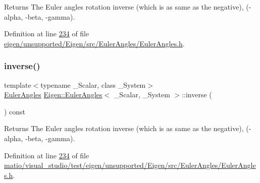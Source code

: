 \begin{DoxyReturn}{Returns}
The Euler angles rotation inverse (which is as same as the negative), (-\/alpha, -\/beta, -\/gamma). 
\end{DoxyReturn}


Definition at line \hyperlink{eigen_2unsupported_2_eigen_2src_2_euler_angles_2_euler_angles_8h_source_l00234}{234} of file \hyperlink{eigen_2unsupported_2_eigen_2src_2_euler_angles_2_euler_angles_8h_source}{eigen/unsupported/\+Eigen/src/\+Euler\+Angles/\+Euler\+Angles.\+h}.

\mbox{\label{class_eigen_1_1_euler_angles_a1c37cedc590311d6ecaec7215d7c8f2c}} 
\subsubsection{\texorpdfstring{inverse()}{inverse()}\hspace{0.1cm}{\footnotesize\ttfamily [2/2]}}
{\footnotesize\ttfamily template$<$typename \+\_\+\+Scalar, class \+\_\+\+System$>$ \\
\hyperlink{class_eigen_1_1_euler_angles}{Euler\+Angles} \hyperlink{class_eigen_1_1_euler_angles}{Eigen\+::\+Euler\+Angles}$<$ \+\_\+\+Scalar, \+\_\+\+System $>$\+::inverse (\begin{DoxyParamCaption}{ }\end{DoxyParamCaption}) const\hspace{0.3cm}{\ttfamily [inline]}}

\begin{DoxyReturn}{Returns}
The Euler angles rotation inverse (which is as same as the negative), (-\/alpha, -\/beta, -\/gamma). 
\end{DoxyReturn}


Definition at line \hyperlink{matio_2visual__studio_2test_2eigen_2unsupported_2_eigen_2src_2_euler_angles_2_euler_angles_8h_source_l00234}{234} of file \hyperlink{matio_2visual__studio_2test_2eigen_2unsupported_2_eigen_2src_2_euler_angles_2_euler_angles_8h_source}{matio/visual\+\_\+studio/test/eigen/unsupported/\+Eigen/src/\+Euler\+Angles/\+Euler\+Angles.\+h}.

\mbox{\label{class_eigen_1_1_euler_angles_aa4ccd4b412c3146a9dd58a884eaea42e}} 
